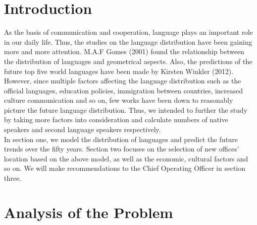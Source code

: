 \documentclass{mcmthesis}
\begin{document}
\section{Introduction}
As the basis of communication and cooperation, language plays an important role in our daily life. Thus, the studies on the language distribution have been gaining more and more attention. M.A.F Gomes (2001) found the relationship between the distribution of languages and geometrical aspects. Also, the predictions of the future top five world languages have been made by Kirsten Winkler (2012).\\
\indent However, since multiple factors affecting the language distribution such as the official languages, education policies, immigration between countries, increased culture communication and so on, few works have been down to reasonably picture the future language distribution. Thus, we intended to further the study by taking more factors into consideration and calculate numbers of native speakers and second language speakers respectively.\\
\indent In section one, we model the distribution of languages and predict the future trends over the fifty years. Section two focuses on the selection of new offices' location based on the above model, as well as the economic, cultural factors and so on. We will make recommendations to the Chief Operating Officer in section three. 
  
\section{Analysis of the Problem}
\end{document}
